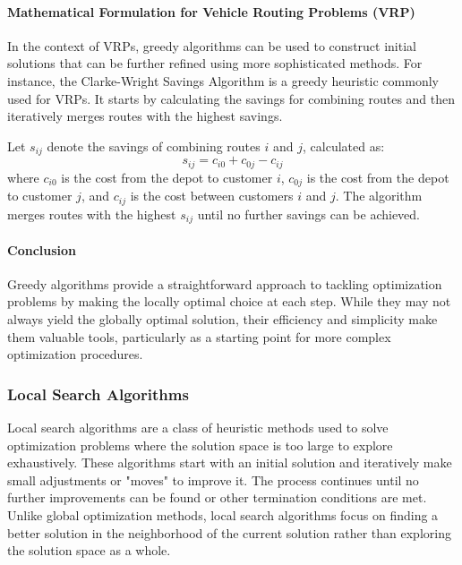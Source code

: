 \documentclass[
]{article}
\begin{document}
\paragraph{Mathematical Formulation for Vehicle Routing Problems (VRP)}

In the context of VRPs, greedy algorithms can be used to construct initial solutions that can be further refined using more sophisticated methods. For instance, the Clarke-Wright Savings Algorithm is a greedy heuristic commonly used for VRPs. It starts by calculating the savings for combining routes and then iteratively merges routes with the highest savings.

Let \(s_{ij}\) denote the savings of combining routes \(i\) and \(j\), calculated as:
\[
s_{ij} = c_{i0} + c_{0j} - c_{ij}
\]
where \(c_{i0}\) is the cost from the depot to customer \(i\), \(c_{0j}\) is the cost from the depot to customer \(j\), and \(c_{ij}\) is the cost between customers \(i\) and \(j\). The algorithm merges routes with the highest \(s_{ij}\) until no further savings can be achieved.

\paragraph{Conclusion}

Greedy algorithms provide a straightforward approach to tackling optimization problems by making the locally optimal choice at each step. While they may not always yield the globally optimal solution, their efficiency and simplicity make them valuable tools, particularly as a starting point for more complex optimization procedures.


\hypertarget{local-search-algorithms}{%
  \subsubsection{Local Search Algorithms}\label{local-search-algorithms}}

Local search algorithms are a class of heuristic methods used to solve optimization problems where the solution space is too large to explore exhaustively. These algorithms start with an initial solution and iteratively make small adjustments or "moves" to improve it. The process continues until no further improvements can be found or other termination conditions are met. Unlike global optimization methods, local search algorithms focus on finding a better solution in the neighborhood of the current solution rather than exploring the solution space as a whole.
\end{document}
